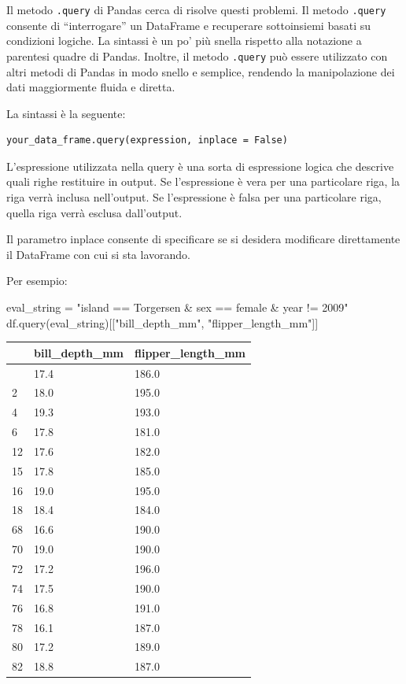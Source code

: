 \documentclass[
  letterpaper,
  krantz2]{{[}./krantz{]}}
\newenvironment{Shaded}{\begin{snugshade}}{\end{snugshade}}
\newcommand{\NormalTok}[1]{\textcolor[rgb]{0.00,0.23,0.31}{#1}}
\newcommand{\OperatorTok}[1]{\textcolor[rgb]{0.37,0.37,0.37}{#1}}
\newcommand{\StringTok}[1]{\textcolor[rgb]{0.13,0.47,0.30}{#1}}
\begin{document}
Il metodo \texttt{.query} di Pandas cerca di risolve questi problemi. Il
metodo \texttt{.query} consente di ``interrogare'' un DataFrame e
recuperare sottoinsiemi basati su condizioni logiche. La sintassi è un
po' più snella rispetto alla notazione a parentesi quadre di Pandas.
Inoltre, il metodo \texttt{.query} può essere utilizzato con altri
metodi di Pandas in modo snello e semplice, rendendo la manipolazione
dei dati maggiormente fluida e diretta.

La sintassi è la seguente:

\begin{verbatim}
your_data_frame.query(expression, inplace = False)
\end{verbatim}

L'espressione utilizzata nella query è una sorta di espressione logica
che descrive quali righe restituire in output. Se l'espressione è vera
per una particolare riga, la riga verrà inclusa nell'output. Se
l'espressione è falsa per una particolare riga, quella riga verrà
esclusa dall'output.

Il parametro inplace consente di specificare se si desidera modificare
direttamente il DataFrame con cui si sta lavorando.

Per esempio:

\begin{Shaded}
\begin{Highlighting}[]
\NormalTok{eval\_string }\OperatorTok{=} \StringTok{"island == \textquotesingle{}Torgersen\textquotesingle{} \& sex == \textquotesingle{}female\textquotesingle{} \& year != 2009"}
\NormalTok{df.query(eval\_string)[[}\StringTok{"bill\_depth\_mm"}\NormalTok{, }\StringTok{"flipper\_length\_mm"}\NormalTok{]]}
\end{Highlighting}
\end{Shaded}

\begin{longtable}[]{@{}lll@{}}
\toprule\noalign{}
& bill\_depth\_mm & flipper\_length\_mm \\
\midrule\noalign{}
\endhead
\bottomrule\noalign{}
\endlastfoot
1 & 17.4 & 186.0 \\
2 & 18.0 & 195.0 \\
4 & 19.3 & 193.0 \\
6 & 17.8 & 181.0 \\
12 & 17.6 & 182.0 \\
15 & 17.8 & 185.0 \\
16 & 19.0 & 195.0 \\
18 & 18.4 & 184.0 \\
68 & 16.6 & 190.0 \\
70 & 19.0 & 190.0 \\
72 & 17.2 & 196.0 \\
74 & 17.5 & 190.0 \\
76 & 16.8 & 191.0 \\
78 & 16.1 & 187.0 \\
80 & 17.2 & 189.0 \\
82 & 18.8 & 187.0 \\
\end{longtable}
\end{document}
